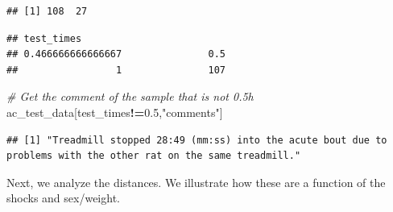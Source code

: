 \documentclass[]{article}
\newenvironment{Shaded}{\begin{snugshade}}{\end{snugshade}}
\newcommand{\KeywordTok}[1]{\textcolor[rgb]{0.13,0.29,0.53}{\textbf{#1}}}
\newcommand{\FloatTok}[1]{\textcolor[rgb]{0.00,0.00,0.81}{#1}}
\newcommand{\StringTok}[1]{\textcolor[rgb]{0.31,0.60,0.02}{#1}}
\newcommand{\CommentTok}[1]{\textcolor[rgb]{0.56,0.35,0.01}{\textit{#1}}}
\newcommand{\OperatorTok}[1]{\textcolor[rgb]{0.81,0.36,0.00}{\textbf{#1}}}
\newcommand{\NormalTok}[1]{#1}
\begin{document}
\begin{verbatim}
## [1] 108  27
\end{verbatim}

\begin{Shaded}
\end{Shaded}

\begin{verbatim}
## test_times
## 0.466666666666667               0.5 
##                 1               107
\end{verbatim}

\begin{Shaded}
\begin{Highlighting}[]
\CommentTok{# Get the comment of the sample that is not 0.5h}
\NormalTok{ac_test_data[test_times}\OperatorTok{!=}\FloatTok{0.5}\NormalTok{,}\StringTok{"comments"}\NormalTok{]}
\end{Highlighting}
\end{Shaded}

\begin{verbatim}
## [1] "Treadmill stopped 28:49 (mm:ss) into the acute bout due to problems with the other rat on the same treadmill."
\end{verbatim}

\begin{Shaded}
\end{Shaded}

Next, we analyze the distances. We illustrate how these are a function
of the shocks and sex/weight.
\end{document}
